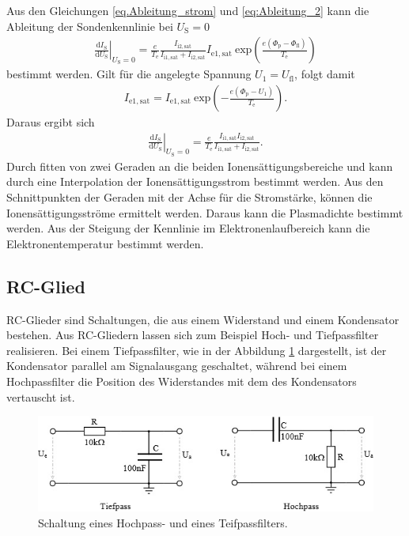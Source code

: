 Aus den Gleichungen \eqref{eq.Ableitung_strom} und \eqref{eq:Ableitung_2} kann die Ableitung der Sondenkennlinie bei $U_{\mathrm{S}}=0$ 
\begin{align}
\left. \frac{\mathrm{d} I_{\mathrm{S}}}{\mathrm{d} U_{\mathrm{S}}}\right\vert_{U_{\mathrm{S}}=0} = \frac{e}{T_{\mathrm{e}}}  \frac{I_{\mathrm{i}2,\mathrm{sat}}}{I_{\mathrm{i}1,\mathrm{sat}}+I_{\mathrm{i}2,\mathrm{sat}}}  I_{\mathrm{e}1,\mathrm{sat}}\ \mathrm{exp} \left( \frac{e(\Phi_{\mathrm{p}}-\Phi_{\mathrm{fl}})}{T_{\mathrm{e}}}\right)
\end{align}
bestimmt werden. Gilt für die angelegte Spannung $U_1=U_{\mathrm{fl}}$, folgt damit
\begin{align}
I_{\mathrm{e}1,\mathrm{sat}} =I_{\mathrm{e}1,\mathrm{sat}}\ \mathrm{exp} \left( -\frac{e(\Phi_{\mathrm{p}}-U_1)}{T_{\mathrm{e}}} \right).
\end{align}
Daraus ergibt sich
\begin{align}
\left. \frac{\mathrm{d} I_{\mathrm{S}}}{\mathrm{d} U_{\mathrm{S}}}\right\vert_{U_{\mathrm{S}}=0} = \frac{e}{T_{\mathrm{e}}}\frac{I_{\mathrm{i}1,\mathrm{sat}} I_{\mathrm{i}2,\mathrm{sat}} }{I_{\mathrm{i}1,\mathrm{sat}}+I_{\mathrm{i}2,\mathrm{sat}}}.
\end{align}
Durch fitten von zwei Geraden an die beiden Ionensättigungsbereiche und kann durch eine Interpolation der Ionensättigungsstrom bestimmt werden. Aus den Schnittpunkten der Geraden mit der Achse für die Stromstärke, können die Ionensättigungsströme ermittelt werden. Daraus kann die Plasmadichte bestimmt werden.  Aus der Steigung der Kennlinie im Elektronenlaufbereich kann die Elektronentemperatur bestimmt werden.  
\subsection{RC-Glied}
RC-Glieder sind Schaltungen, die aus einem Widerstand und einem Kondensator bestehen.  Aus RC-Gliedern lassen sich zum Beispiel Hoch- und Tiefpassfilter realisieren. Bei einem Tiefpassfilter, wie in der Abbildung \ref{fig:Hochpass_Teifpass} dargestellt, ist der Kondensator parallel am Signalausgang geschaltet, während bei einem Hochpassfilter die Position des Widerstandes mit dem des Kondensators vertauscht ist.   
\begin{figure}[H]
\centering
\includegraphics[scale=0.6]{Hochpass_Tiefpass.jpg}
\caption{Schaltung eines Hochpass- und eines Teifpassfilters. \cite{Hochpass_Tiefpass}}
\label{fig:Hochpass_Teifpass}
\end{figure}
